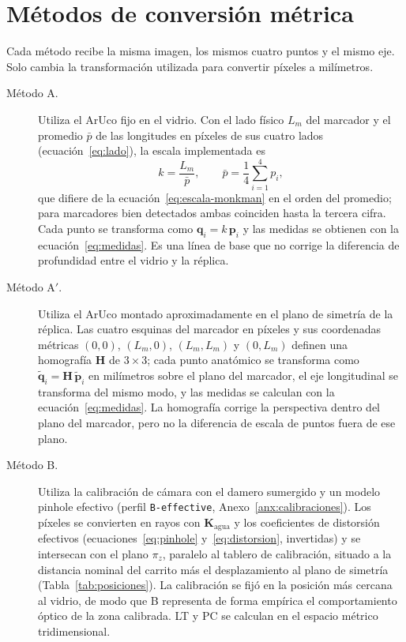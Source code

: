 \documentclass{report}
\newcommand{\Aprime}{A$'$}
\begin{document}
\section{Métodos de conversión métrica}
\label{sec:metodos}

Cada método recibe la misma imagen, los mismos cuatro puntos y el mismo eje. Solo cambia la transformación utilizada para convertir píxeles a milímetros.

\begin{description}
  \item[Método A.] Utiliza el ArUco fijo en el vidrio. Con el lado físico $L_m$ del marcador y el promedio $\bar{p}$ de las longitudes en píxeles de sus cuatro lados (ecuación~\ref{eq:lado}), la escala implementada es
  \begin{equation}
    k = \frac{L_m}{\bar{p}}, \qquad \bar{p} = \frac{1}{4}\sum_{i=1}^{4} p_i,
    \label{eq:escala-impl}
  \end{equation}
  que difiere de la ecuación~\eqref{eq:escala-monkman} en el orden del promedio; para marcadores bien detectados ambas coinciden hasta la tercera cifra. Cada punto se transforma como $\mathbf{q}_i = k\,\mathbf{p}_i$ y las medidas se obtienen con la ecuación~\eqref{eq:medidas}. Es una línea de base que no corrige la diferencia de profundidad entre el vidrio y la réplica.
  \item[Método \Aprime.] Utiliza el ArUco montado aproximadamente en el plano de simetría de la réplica. Las cuatro esquinas del marcador en píxeles y sus coordenadas métricas $(0,0)$, $(L_m,0)$, $(L_m,L_m)$ y $(0,L_m)$ definen una homografía $\mathbf{H}$ de $3 \times 3$; cada punto anatómico se transforma como $\tilde{\mathbf{q}}_i = \mathbf{H}\,\tilde{\mathbf{p}}_i$ en milímetros sobre el plano del marcador, el eje longitudinal se transforma del mismo modo, y las medidas se calculan con la ecuación~\eqref{eq:medidas}. La homografía corrige la perspectiva dentro del plano del marcador, pero no la diferencia de escala de puntos fuera de ese plano.
  \item[Método B.] Utiliza la calibración de cámara con el damero sumergido y un modelo pinhole efectivo (perfil \texttt{B-effective}, Anexo~\ref{anx:calibraciones}). Los píxeles se convierten en rayos con $\mathbf{K}_{\mathrm{agua}}$ y los coeficientes de distorsión efectivos (ecuaciones~\ref{eq:pinhole} y~\ref{eq:distorsion}, invertidas) y se intersecan con el plano $\pi_z$, paralelo al tablero de calibración, situado a la distancia nominal del carrito más el desplazamiento al plano de simetría (Tabla~\ref{tab:posiciones}). La calibración se fijó en la posición más cercana al vidrio, de modo que B representa de forma empírica el comportamiento óptico de la zona calibrada. LT y PC se calculan en el espacio métrico tridimensional.

\end{description}
\end{document}
